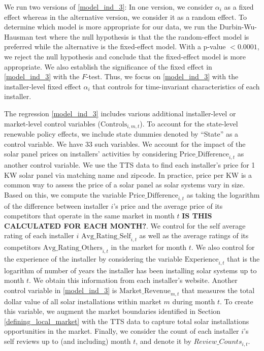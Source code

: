 \documentclass[msom,blindrev]{informs3}
\begin{document}
 We run two versions of \eqref{model_ind_3}: In one version, we consider $\alpha_{i}$ as a fixed effect whereas in the alternative version, we consider it as a random effect. To determine which model is more appropriate for our data, we run the Durbin-Wu-Hausman test where the null hypothesis is that the the random-effect model is preferred while the alternative is the fixed-effect model. With a p-value $<0.0001$, we reject the null hypothesis and conclude that the fixed-effect model is more appropriate. We also establish the significance of the fixed effect in \eqref{model_ind_3} with the $F$-test. Thus, we focus on \eqref{model_ind_3} with the installer-level fixed effect $\alpha_{i}$ that controls for time-invariant characteristics of each installer.


 The regression \eqref{model_ind_3} includes various additional installer-level or market-level control variables ($\text{Controls}_{i,m,t}$). To account for the state-level renewable policy effects, we include state dummies denoted by ``State'' as a control variable. We have 33 such variables. We account for the impact of the solar panel prices on installers' activities by considering $\text{Price\_Difference}_{i,t}$ as another control variable. We use the TTS data to find each installer's price for 1 KW solar panel via matching name and zipcode. In practice, price per KW is a common way to assess the price of a solar panel as solar systems vary in size. Based on this, we compute the variable $\text{Price\_Difference}_{i,t}$ as taking the logarithm of the difference between installer $i$'s price and the average price of its competitors that operate in the same market in month $t$ \textbf{IS THIS CALCULATED FOR EACH MONTH?}.
 We control for the self average rating of each installer $i$ $\text{Avg\_Rating\_Self}_{i,t}$  as well as the average ratings of its competitors $\text{Avg\_Rating\_Others}_{i,t}$ in the market for month $t$. We also control for the experience of the installer by considering the variable $\text{Experience}_{i,t}$ that is the logarithm of number of years the installer has been installing solar systems up to month $t$. We obtain this information from each installer's website. Another control variable in \eqref{model_ind_3} is $\text{Market\_Revenue}_{m,t}$  that measures the total dollar value of all solar installations within market $m$ during month $t$. To create this variable, we augment the market boundaries identified in Section \ref{defining_local_market} with the TTS data to capture total  solar installations opportunities in the market. Finally, we consider the count of each installer $i$'s self reviews up to (and including) month $t$, and denote it by $Review\_Counts_{i,t}$.
\end{document}

